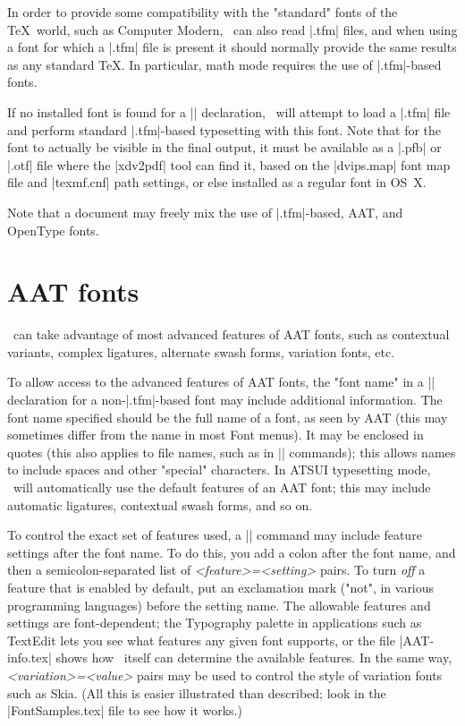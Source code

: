 In order to provide some compatibility with the "standard" fonts of the \TeX\ world, such as Computer Modern, \XeTeX\ can also read |.tfm| files, and when using a font for which a |.tfm| file is present it should normally provide the same results as any standard \TeX. In particular, math mode requires the use of |.tfm|-based fonts.

If no installed font is found for a |\font| declaration, \XeTeX\ will attempt to load a |.tfm| file and perform standard |.tfm|-based typesetting with this font. Note that for the font to actually be visible in the final output, it must be available as a |.pfb| or |.otf| file where the |xdv2pdf| tool can find it, based on the |dvips.map| font map file and |texmf.cnf| path settings, or else installed as a regular font in OS~X.

Note that a document may freely mix the use of |.tfm|-based, AAT, and OpenType fonts.

\section{AAT fonts}

\XeTeX\ can take advantage of most advanced features of AAT fonts, such as contextual variants, complex ligatures, alternate swash forms, variation fonts, etc.

To allow access to the advanced features of AAT fonts, the "font name" in a |\font| declaration for a non-|.tfm|-based font may include additional information. The font name specified should be the full name of a font, as seen by AAT (this may sometimes differ from the name in most Font menus). It may be enclosed in quotes (this also applies to file names, such as in || commands); this allows names to include spaces and other "special" characters. In ATSUI typesetting mode, \XeTeX\ will automatically use the default features of an AAT font; this may include automatic ligatures, contextual swash forms, and so on.

To control the exact set of features used, a |\font| command may include feature settings after the font name. To do this, you add a colon after the font name, and then a semicolon-separated list of {\em <feature>=<setting>} pairs. To turn {\em off} a feature that is enabled by default, put an exclamation mark ("not", in various programming languages) before the setting name. The allowable features and settings are font-dependent; the Typography palette in applications such as TextEdit lets you see what features any given font supports, or the file |AAT-info.tex| shows how \XeTeX\ itself can determine the available features. In the same way, {\em <variation>=<value>} pairs may be used to control the style of variation fonts such as Skia. (All this is easier illustrated than described; look in the |FontSamples.tex| file to see how it works.)

